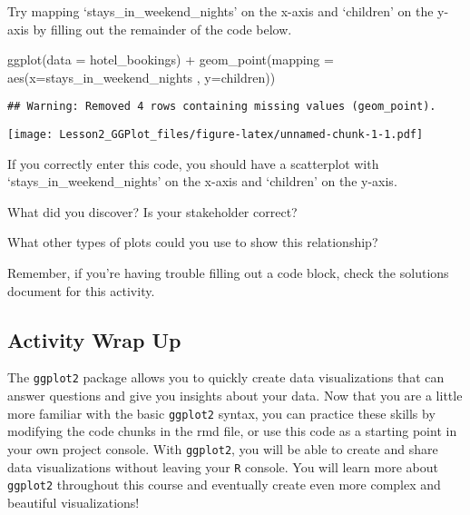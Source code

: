 \documentclass[
]{article}
\newenvironment{Shaded}{\begin{snugshade}}{\end{snugshade}}
\newcommand{\AttributeTok}[1]{\textcolor[rgb]{0.77,0.63,0.00}{#1}}
\newcommand{\FunctionTok}[1]{\textcolor[rgb]{0.00,0.00,0.00}{#1}}
\newcommand{\NormalTok}[1]{#1}
\newcommand{\SpecialCharTok}[1]{\textcolor[rgb]{0.00,0.00,0.00}{#1}}
\begin{document}
Try mapping `stays\_in\_weekend\_nights' on the x-axis and `children' on
the y-axis by filling out the remainder of the code below.

\begin{Shaded}
\begin{Highlighting}[]
\FunctionTok{ggplot}\NormalTok{(}\AttributeTok{data =}\NormalTok{ hotel\_bookings) }\SpecialCharTok{+}
 \FunctionTok{geom\_point}\NormalTok{(}\AttributeTok{mapping =} \FunctionTok{aes}\NormalTok{(}\AttributeTok{x=}\NormalTok{stays\_in\_weekend\_nights , }\AttributeTok{y=}\NormalTok{children))}
\end{Highlighting}
\end{Shaded}

\begin{verbatim}
## Warning: Removed 4 rows containing missing values (geom_point).
\end{verbatim}

\texttt{[image: Lesson2\_GGPlot\_files/figure-latex/unnamed-chunk-1-1.pdf]}

If you correctly enter this code, you should have a scatterplot with
`stays\_in\_weekend\_nights' on the x-axis and `children' on the y-axis.

What did you discover? Is your stakeholder correct?

What other types of plots could you use to show this relationship?

Remember, if you're having trouble filling out a code block, check the
solutions document for this activity.

\hypertarget{activity-wrap-up}{%
\subsection{Activity Wrap Up}\label{activity-wrap-up}}

The \texttt{ggplot2} package allows you to quickly create data
visualizations that can answer questions and give you insights about
your data. Now that you are a little more familiar with the basic
\texttt{ggplot2} syntax, you can practice these skills by modifying the
code chunks in the rmd file, or use this code as a starting point in
your own project console. With \texttt{ggplot2}, you will be able to
create and share data visualizations without leaving your \texttt{R}
console. You will learn more about \texttt{ggplot2} throughout this
course and eventually create even more complex and beautiful
visualizations!
\end{document}

